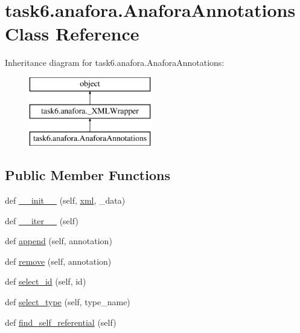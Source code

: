 \hypertarget{classtask6_1_1anafora_1_1AnaforaAnnotations}{}\section{task6.\+anafora.\+Anafora\+Annotations Class Reference}
\label{classtask6_1_1anafora_1_1AnaforaAnnotations}
Inheritance diagram for task6.\+anafora.\+Anafora\+Annotations\+:\begin{figure}[H]
\begin{center}
\leavevmode
\includegraphics[height=3.000000cm]{classtask6_1_1anafora_1_1AnaforaAnnotations}
\end{center}
\end{figure}
\subsection*{Public Member Functions}
\begin{DoxyCompactItemize}
\item 
def \hyperlink{classtask6_1_1anafora_1_1AnaforaAnnotations_a9255cb4c65e5239fd8b7c4b414cc0d66}{\+\_\+\+\_\+init\+\_\+\+\_\+} (self, \hyperlink{classtask6_1_1anafora_1_1AnaforaAnnotations_a19e9dbf93b6e008cbca014d56f56c3c8}{xml}, \+\_\+data)
\item 
def \hyperlink{classtask6_1_1anafora_1_1AnaforaAnnotations_a1f42cfeb13913e533616c07b95e537c1}{\+\_\+\+\_\+iter\+\_\+\+\_\+} (self)
\item 
def \hyperlink{classtask6_1_1anafora_1_1AnaforaAnnotations_adbbbaf21bb72a2475af506b0757252a5}{append} (self, annotation)
\item 
def \hyperlink{classtask6_1_1anafora_1_1AnaforaAnnotations_aef4b84a0f1d029da18f5bbc96f4a2087}{remove} (self, annotation)
\item 
def \hyperlink{classtask6_1_1anafora_1_1AnaforaAnnotations_a93ec7945f1fa219d2df022c4a7a0e808}{select\+\_\+id} (self, id)
\item 
def \hyperlink{classtask6_1_1anafora_1_1AnaforaAnnotations_a0a8167f71900c00ed74d88debb4a7458}{select\+\_\+type} (self, type\+\_\+name)
\item 
def \hyperlink{classtask6_1_1anafora_1_1AnaforaAnnotations_a7fe608c34d5489996bcc951065230db8}{find\+\_\+self\+\_\+referential} (self)
\end{DoxyCompactItemize}
